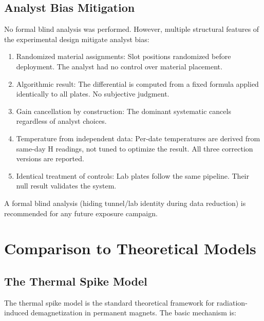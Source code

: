 \documentclass[11pt,letterpaper]{article}
\begin{document}
\subsection{Analyst Bias Mitigation}
\label{sec:bias}

No formal blind analysis was performed. However, multiple structural features
of the experimental design mitigate analyst bias:

\begin{enumerate}
    \item Randomized material assignments: Slot positions randomized
    before deployment. The analyst had no control over material placement.
    \item Algorithmic result: The differential is computed from a
    fixed formula applied identically to all plates. No subjective judgment.
    \item Gain cancellation by construction: The dominant systematic
    cancels regardless of analyst choices.
    \item Temperature from independent data: Per-date temperatures
    are derived from same-day H readings, not tuned to optimize the result.
    All three correction versions are reported.
    \item Identical treatment of controls: Lab plates follow the
    same pipeline. Their null result validates the system.
\end{enumerate}

A formal blind analysis (hiding tunnel/lab identity during data reduction) is
recommended for any future exposure campaign.

\section{Comparison to Theoretical Models}
\label{sec:theory}

\subsection{The Thermal Spike Model}
\label{sec:thermal_spike}

The thermal spike model \cite{Cost1988,Shen2018} is the standard theoretical
framework for radiation-induced demagnetization in permanent magnets. The basic
mechanism is:
\end{document}
